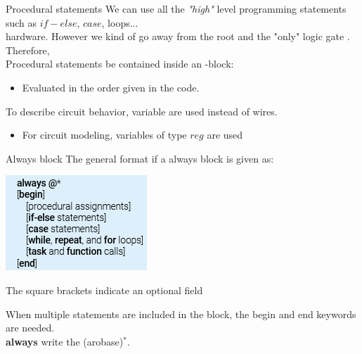 \begin{parag}{Procedural statements}
    We can use all the \textit{"high"} level programming statements such as $if-else$, $case$, loops...\\
    hardware. However we kind of go away from the root and the "only" logic gate . Therefore, \\
    Procedural statements  be contained inside an -block:
    \begin{itemize}
        \item Evaluated in the order given in the code.
    \end{itemize}
    To describe circuit behavior, variable are used instead of wires.
    \begin{itemize}
        \item For circuit modeling, variables of type $reg$ are used
    \end{itemize}
   
\end{parag}
\begin{parag}{Always block}
    The general format if a always block is given as:
    \begin{center}
        \includegraphics[scale=1]{32025-03-26.png}
    \end{center}
    \begin{framedremark}
        The square brackets indicate an optional field
    \end{framedremark}
    When multiple statements are included in the block, the begin and end keywords are needed.\\
    \textbf{always} write the (arobase)$^*$. 
\end{parag}
